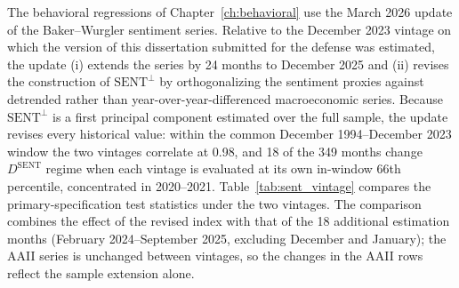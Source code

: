 \documentclass[12pt, oneside]{report}
\renewcommand{\mathrm}[1]{\text{#1}}%
\begin{document}
\noindent The behavioral regressions of Chapter~\ref{ch:behavioral} use
the March 2026 update of the Baker--Wurgler sentiment series. Relative
to the December 2023 vintage on which the version of this dissertation
submitted for the defense was estimated, the update (i) extends the
series by 24 months to December 2025 and (ii) revises the construction
of $\mathrm{SENT}^{\perp}$ by orthogonalizing the sentiment proxies
against detrended rather than year-over-year-differenced macroeconomic
series. Because $\mathrm{SENT}^{\perp}$ is a first principal component
estimated over the full sample, the update revises every historical
value: within the common December 1994--December 2023 window the two
vintages correlate at 0.98, and 18 of the 349 months change
$D^{\text{SENT}}$ regime when each vintage is evaluated at its own
in-window 66th percentile, concentrated in 2020--2021.
Table~\ref{tab:sent_vintage} compares the primary-specification test
statistics under the two vintages. The comparison combines the effect
of the revised index with that of the 18 additional estimation months
(February 2024--September 2025, excluding December and January); the
AAII
series is unchanged between vintages, so the changes in the AAII rows
reflect the sample extension alone.
\end{document}
